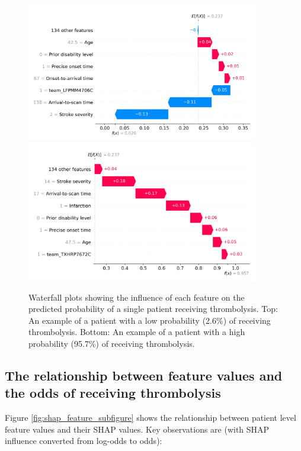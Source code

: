 \begin{figure}[!ht]
    \includegraphics[width=0.9\textwidth]{./images/03_xgb_10_features_waterfall_probability_low}
    \includegraphics[width=0.9\textwidth]{./images/03_xgb_10_features_waterfall_probability_high}
\caption{Waterfall plots showing the influence of each feature on the predicted probability of a single patient receiving thrombolysis. Top: An example of a patient with a low probability (2.6\%) of receiving thrombolysis. Bottom: An example of a patient with a high probability (95.7\%) of receiving thrombolysis.}
\label{fig:results_waterfall}
\end{figure}


\subsection{The relationship between feature values and the odds of receiving thrombolysis}

Figure \ref{fig:shap_feature_subfigure} shows the relationship between patient level feature values and their SHAP values. Key observations are (with SHAP influence converted from log-odds to odds):

